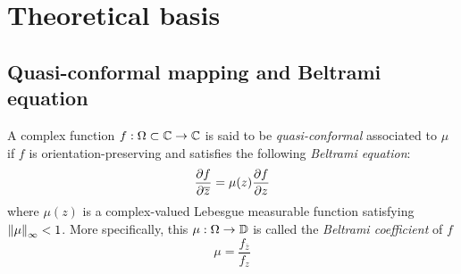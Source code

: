 \documentclass[review,onefignum,onetabnum]{siamonline190516}
\begin{document}

\section{Theoretical basis}\label{background}
\subsection{Quasi-conformal mapping and Beltrami equation}
A complex function $f: \Omega \subset \mathbb{C} \rightarrow \mathbb{C}$ is said to be \textit{quasi-conformal} associated to $\mu$ if $f$ is orientation-preserving and satisfies the following \textit{Beltrami equation}:
\begin{equation}\label{beltrami eq}
    \Part{f}{\overline{z}} = \mu(z) \Part{f}{z}
\end{equation}
where $\mu(z)$ is a complex-valued Lebesgue measurable function satisfying $\left\Vert \mu \right\Vert_\infty < 1$. More specifically, this $\mu: \Omega \rightarrow \mathbb{D}$ is called the \textit{Beltrami coefficient} of $f$
\begin{equation}\label{mu def}
    \mu = \frac{f_{\overline{z}}}{f_{z}}
\end{equation}
\end{document}
